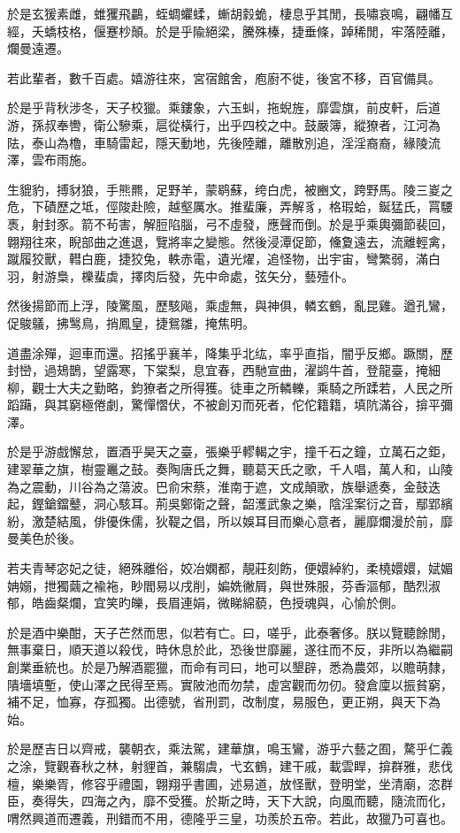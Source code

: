 於是玄猨素雌，蜼玃飛鸓，蛭蜩蠷蝚，螹胡豰蛫，棲息乎其閒，長嘯哀鳴，翩幡互經，夭蟜枝格，偃蹇杪顛。於是乎隃絕梁，騰殊榛，捷垂條，踔稀閒，牢落陸離，爛曼遠遷。

若此輩者，數千百處。嬉游往來，宮宿館舍，庖廚不徙，後宮不移，百官備具。

於是乎背秋涉冬，天子校獵。乘鏤象，六玉虯，拖蜺旌，靡雲旗，前皮軒，后道游，孫叔奉轡，衛公驂乘，扈從橫行，出乎四校之中。鼓嚴簿，縱獠者，江河為阹，泰山為櫓，車騎雷起，隱天動地，先後陸離，離散別追，淫淫裔裔，緣陵流澤，雲布雨施。

生貔豹，搏豺狼，手熊羆，足野羊，蒙鹖蘇，绔白虎，被豳文，跨野馬。陵三嵏之危，下磧歷之坻，俓陖赴險，越壑厲水。推蜚廉，弄解豸，格瑕蛤，鋋猛氏，罥騕褭，射封豕。箭不茍害，解脰陷腦，弓不虛發，應聲而倒。於是乎乘輿彌節裴回，翺翔往來，睨部曲之進退，覽將率之變態。然後浸潭促節，儵夐遠去，流離輕禽，蹴履狡獸，轊白鹿，捷狡兔，軼赤電，遺光燿，追怪物，出宇宙，彎繁弱，滿白羽，射游梟，櫟蜚虡，擇肉后發，先中命處，弦矢分，藝殪仆。

然後揚節而上浮，陵驚風，歷駭飚，乘虛無，與神俱，轔玄鶴，亂昆雞。遒孔鸞，促鵔鸃，拂鹥鳥，捎鳳皇，捷鴛雛，掩焦明。

道盡涂殫，迴車而還。招搖乎襄羊，降集乎北纮，率乎直指，闇乎反鄉。蹶關，歷封巒，過鳷鵲，望露寒，下棠梨，息宜春，西馳宣曲，濯鹢牛首，登龍臺，掩細柳，觀士大夫之勤略，鈞獠者之所得獲。徒車之所轔轢，乘騎之所蹂若，人民之所蹈躤，與其窮極倦劇，驚憚慴伏，不被創刃而死者，佗佗籍籍，填阬滿谷，揜平彌澤。

於是乎游戲懈怠，置酒乎昊天之臺，張樂乎轇輵之宇，撞千石之鐘，立萬石之鉅，建翠華之旗，樹靈鼉之鼓。奏陶唐氏之舞，聽葛天氏之歌，千人唱，萬人和，山陵為之震動，川谷為之蕩波。巴俞宋蔡，淮南于遮，文成顛歌，族舉遞奏，金鼓迭起，鏗鎗鐺鼞，洞心駭耳。荊吳鄭衛之聲，韶濩武象之樂，陰淫案衍之音，鄢郢繽紛，激楚結風，俳優侏儒，狄鞮之倡，所以娛耳目而樂心意者，麗靡爛漫於前，靡曼美色於後。

若夫青琴宓妃之徒，絕殊離俗，姣冶嫻都，靚莊刻飭，便嬛綽約，柔橈嬛嬛，娬媚姌嫋，抴獨繭之褕袘，眇閻易以戌削，媥姺徶屑，與世殊服，芬香漚郁，酷烈淑郁，皓齒粲爛，宜笑旳皪，長眉連娟，微睇綿藐，色授魂與，心愉於側。

於是酒中樂酣，天子芒然而思，似若有亡。曰，嗟乎，此泰奢侈。朕以覽聽餘閒，無事棄日，順天道以殺伐，時休息於此，恐後世靡麗，遂往而不反，非所以為繼嗣創業垂統也。於是乃解酒罷獵，而命有司曰，地可以墾辟，悉為農郊，以贍萌隸，隤墻填塹，使山澤之民得至焉。實陂池而勿禁，虛宮觀而勿仞。發倉廩以振貧窮，補不足，恤寡，存孤獨。出德號，省刑罰，改制度，易服色，更正朔，與天下為始。

於是歷吉日以齊戒，襲朝衣，乘法駕，建華旗，鳴玉鸞，游乎六藝之囿，騖乎仁義之涂，覽觀春秋之林，射貍首，兼騶虞，弋玄鶴，建干戚，載雲睅，揜群雅，悲伐檀，樂樂胥，修容乎禮園，翺翔乎書圃，述易道，放怪獸，登明堂，坐清廟，恣群臣，奏得失，四海之內，靡不受獲。於斯之時，天下大說，向風而聽，隨流而化，喟然興道而遷義，刑錯而不用，德隆乎三皇，功羨於五帝。若此，故獵乃可喜也。


